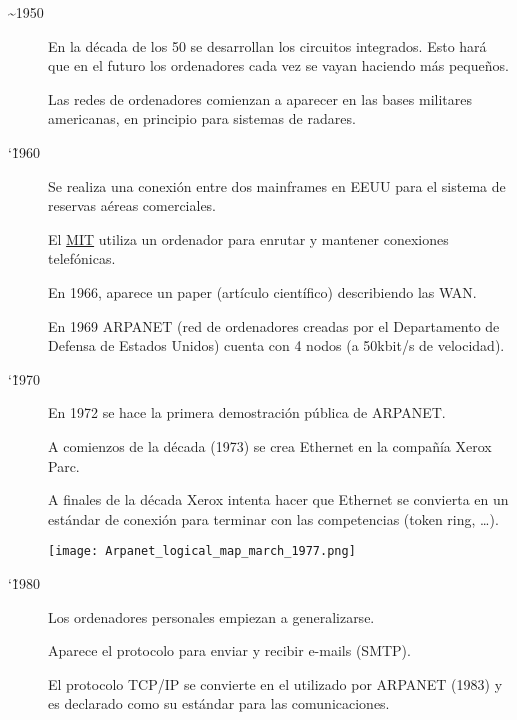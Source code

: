 \begin{description}
    \item[\textasciitilde 1950]
    En la década de los 50 se desarrollan los circuitos integrados. Esto hará que en el futuro los ordenadores cada vez se vayan haciendo más pequeños.

    Las redes de ordenadores comienzan a aparecer en las bases militares americanas, en principio para sistemas de radares.

    \item[\char`\~ 1960]
    Se realiza una conexión entre dos mainframes en EEUU para el sistema de reservas aéreas comerciales.

    El \href{https://es.wikipedia.org/wiki/Instituto_de_Tecnolog%C3%ADa_de_Massachusetts}{MIT} utiliza un ordenador para enrutar y mantener conexiones telefónicas.

    En 1966, aparece un paper (artículo científico) describiendo las WAN.

    En 1969 ARPANET (red de ordenadores creadas por el Departamento de Defensa de Estados Unidos) cuenta con 4 nodos (a 50kbit/s de velocidad).

    \item[\char`\~ 1970]
    En 1972 se hace la primera demostración pública de ARPANET.

    A comienzos de la década (1973) se crea Ethernet en la compañía Xerox Parc.

    A finales de la década Xerox intenta hacer que Ethernet se convierta en un estándar de conexión para terminar con las competencias (token ring, …).

    \begin{center}
        \vspace{-10pt}
        \texttt{[image: Arpanet\_logical\_map\_march\_1977.png]}
        \vspace{-5pt}
        \vspace{-13pt}
    \end{center}

    \item[\char`\~ 1980]
    Los ordenadores personales empiezan a generalizarse.

    Aparece el protocolo para enviar y recibir e-mails (SMTP).

    El protocolo TCP/IP se convierte en el utilizado por ARPANET (1983) y es declarado como su estándar para las comunicaciones.


\end{description}
